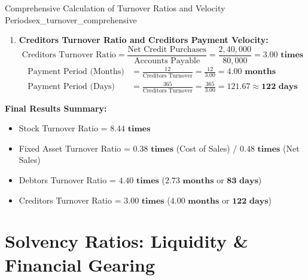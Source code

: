 \begin{example}{Comprehensive Calculation of Turnover Ratios and Velocity Periods}{ex_turnover_comprehensive}
\begin{enumerate}[leftmargin=*]
    \item \textbf{Creditors Turnover Ratio and Creditors Payment Velocity:}
    \begin{equation*}
        \text{Creditors Turnover Ratio} = \frac{\text{Net Credit Purchases}}{\text{Accounts Payable}} = \frac{2{,}40{,}000}{80{,}000} = \mathbf{3.00 \text{ times}}
    \end{equation*}
    \begin{align*}
        \text{Payment Period (Months)} &= \frac{12}{\text{Creditors Turnover}} = \frac{12}{3.00} = \mathbf{4.00 \text{ months}} \\[0.4em]
        \text{Payment Period (Days)} &= \frac{365}{\text{Creditors Turnover}} = \frac{365}{3.00} = \mathbf{121.67 \approx 122 \text{ days}}
    \end{align*}
\end{enumerate}

\textbf{Final Results Summary:}
\begin{itemize}[noitemsep]
    \item Stock Turnover Ratio = $\mathbf{8.44 \text{ times}}$
    \item Fixed Asset Turnover Ratio = $\mathbf{0.38 \text{ times}}$ (Cost of Sales) / $\mathbf{0.48 \text{ times}}$ (Net Sales)
    \item Debtors Turnover Ratio = $\mathbf{4.40 \text{ times}}$ ($\mathbf{2.73 \text{ months}}$ or $\mathbf{83 \text{ days}}$)
    \item Creditors Turnover Ratio = $\mathbf{3.00 \text{ times}}$ ($\mathbf{4.00 \text{ months}}$ or $\mathbf{122 \text{ days}}$)
\end{itemize}
\end{example}


\newpage
\section{Solvency Ratios: Liquidity \& Financial Gearing}

